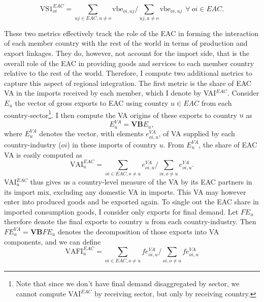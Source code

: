 \documentclass[a4paper]{article}
\begin{document}
\begin{equation} \label{eq:VS1_EAC}
\text{VS1}_{oi}^{EAC} =  \sum_{uj \in EAC, u \neq  o} \text{vbe}_{oi, uj} \bigg/ \sum_{uj, u \neq  o} \text{vbe}_{oi, uj}\ \ \forall\ oi \in EAC.
\end{equation}

These two metrics effectively track the role of the EAC in forming the interaction of each member country with the rest of the world in terms of production and export linkages. They do, however, not account for the import side, that is the overall role of the EAC in providing goods and services to each member country relative to the rest of the world. Therefore, I compute two additional metrics to capture this aspect of regional integration. The first metric is the share of EAC VA in the imports received by each member, which I denote by VAI$^{EAC}$. Consider $E_u$ the vector of gross exports to EAC using country $u \in EAC$ from each country-sector\footnote{Note that since we don't have final demand disaggregated by sector, we cannot compute VAI$^{EAC}$ by receiving sector, but only by receiving country.}.%
I then compute the VA origins of these exports to country $u$ as 
\begin{equation}
E_u^{VA} = \textbf{VB}E_u,
\end{equation}
 where $E_u^{VA}$ denotes the vector, with elements $e_{oi, u}^{VA}$, of VA supplied by each country-industry ($oi$) in these imports of country $u$. From  $E_u^{VA}$, the share of EAC VA is easily computed as 
\begin{equation}
\text{VAI}_u^{EAC} = \sum_{oi \in EAC, o \neq u}  e_{oi, u}^{VA}  \bigg/ \sum_{oi, o \neq u}  e_{oi, u}^{VA}.  
\end{equation}
VAI$_u^{EAC}$ thus gives us a country-level measure of the VA by its EAC partners in its import mix, excluding any domestic VA in imports. This VA may however enter into produced goods and be exported again. %
To single out the EAC share in imported consumption goods, I consider only exports for final demand. %
Let $FE_u$ therefore denote the final exports to country $u$ from each country-industry. Then $FE_u^{VA} = \textbf{VB}FE_u$ denotes the decomposition of those exports into VA components, and we can define 
\begin{equation}
\text{VAFI}_{u}^{EAC} = \sum_{oi \in EAC, o \neq u}  fe_{oi, u}^{VA}  \bigg/ \sum_{oi, o \neq u}  fe_{oi, u}^{VA}
\end{equation}
\end{document}
